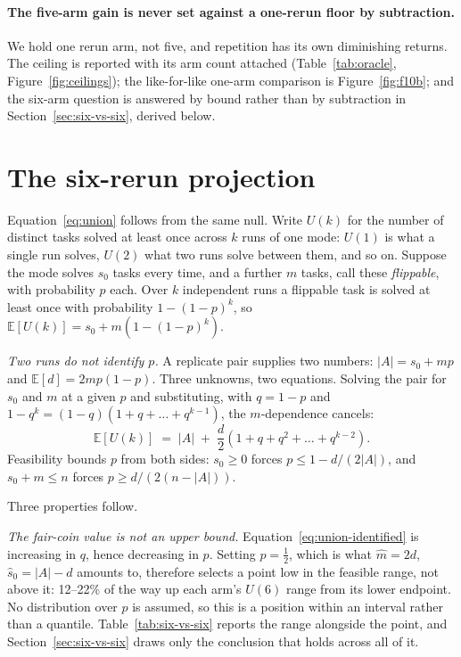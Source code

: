 \paragraph{The five-arm gain is never set against a one-rerun floor by
subtraction.} We hold one rerun arm, not five, and repetition has its own
diminishing returns. The ceiling is reported with its arm count attached
(Table~\ref{tab:oracle}, Figure~\ref{fig:ceilings}); the like-for-like one-arm
comparison is Figure~\ref{fig:f10b}; and the six-arm question is answered by
bound rather than by subtraction in Section~\ref{sec:six-vs-six}, derived below.

\section{The six-rerun projection}
\label{sec:app-union}

Equation~\ref{eq:union} follows from the same null. Write $U(k)$ for the
number of distinct tasks solved at least once across $k$ runs of one mode:
$U(1)$ is what a single run solves, $U(2)$ what two runs solve between them,
and so on. Suppose the mode solves $s_0$ tasks every time, and a further $m$
tasks, call these \emph{flippable}, with probability $p$ each.
Over $k$ independent runs a flippable task is solved at least once with
probability $1-(1-p)^{k}$, so
$\mathbb{E}\left[U(k)\right] = s_0 + m\left(1-(1-p)^{k}\right)$.

\emph{Two runs do not identify $p$.} A replicate pair supplies two numbers:
$|A| = s_0 + mp$ and $\mathbb{E}[d] = 2mp(1-p)$. Three unknowns, two equations.
Solving the pair for $s_0$ and $m$ at a given $p$ and substituting, with
$q = 1-p$ and $1-q^{k} = (1-q)(1+q+\dots+q^{k-1})$, the $m$-dependence cancels:
\begin{equation}
  \mathbb{E}\left[U(k)\right] \;=\; |A| \;+\; \frac{d}{2}\left(1 + q + q^{2} + \dots + q^{k-2}\right).
  \label{eq:union-identified}
\end{equation}
Feasibility bounds $p$ from both sides: $s_0 \ge 0$ forces
$p \le 1 - d/(2|A|)$, and $s_0 + m \le n$ forces $p \ge d/(2(n-|A|))$.

Three properties follow.

\emph{The fair-coin value is not an upper bound.} Equation~\ref{eq:union-identified}
is increasing in $q$, hence decreasing in $p$. Setting $p=\tfrac12$, which is
what $\hat m = 2d$, $\hat s_0 = |A|-d$ amounts to, therefore selects a point
low in the feasible range, not above it: 12--22\% of the way up each arm's
$U(6)$ range from its lower endpoint. No distribution over $p$ is assumed, so
this is a position within an interval rather than a quantile. Table~\ref{tab:six-vs-six} reports the range alongside
the point, and Section~\ref{sec:six-vs-six} draws only the conclusion that holds
across all of it.

